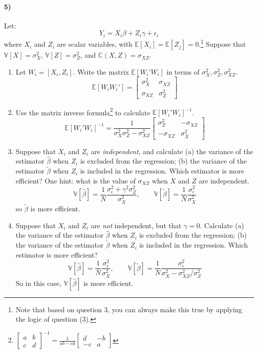 \documentclass[12pt]{article}
\newcommand\BB{\mathbb}
\newcommand\EE{\mathbb{E}}
\newcommand\eps{\epsilon}
\newcommand\barr{\begin{array}}
\newcommand\earr{\end{array}}
\numberwithin{equation}{section}
\numberwithin{figure}{section}
\numberwithin{table}{section}
\begin{document}
\paragraph{5)} Let:
\[Y_i = X_i\beta + Z_i\gamma + \eps_i \]
where $X_i$ and $Z_i$ are scalar variables, with $\EE[X_i]=\EE[Z_j]=0$.\footnote{Note that based on question 3, you can always make this true by applying the logic of question (3).}
Suppose that $\BB{V}[X] = \sigma^2_X$, $\BB{V}[Z]=\sigma^2_Z$, and $\BB{C}(X,Z)=\sigma_{XZ}$.
\begin{enumerate}
\item Let $W_i=[X_i, Z_i]$. Write the matrix $\EE[W_i'W_i]$ in terms of $\sigma^2_X,\sigma^2_Z,\sigma^2_{XZ}$. 
{\color{blue} \[\EE[W_iW_i'] = \left[\barr{cc}\sigma^2_X & \sigma_{XZ} \\ \sigma_{XZ} & \sigma^2_Z \earr\right] \]}

\item Use the matrix inverse formula\footnote{$\left[\begin{array}{cc}a & b \\c & d \end{array}\right]^{-1}=\frac{1}{ab-cd}\left[\begin{array}{cc}d & -b \\-c & a \end{array}\right]$} to calculate $\EE[W_i'W_i]^{-1}$.
{\color{blue}\[ \EE[W_i'W_i]^{-1} = \frac{1}{\sigma^2_{X}\sigma^2_Z - \sigma_{XZ}^2} \left[\barr{cc} \sigma^2_Z & -\sigma_{XZ} \\-\sigma_{XZ} & \sigma^2_X  \earr\right] \]}
\item Suppose that $X_i$ and $Z_i$ are \emph{independent}, and calculate (a) the variance of the estimator $\hat{\beta}$ when $Z_i$ is excluded from the regression; (b) the variance of the estimator $\tilde{\beta}$ when $Z_i$ is included in the regression. Which estimator is more efficient? One hint: what is the value of $\sigma_{XZ}$ when $X$ and $Z$ are independent.
{\color{blue}
\[\BB{V}[\hat{\beta}] = \frac{1}{N}\frac{\sigma^2_\eps + \gamma^2\sigma^2_Z }{\sigma^2_X},\qquad \BB{V}[\tilde{\beta}] = \frac{1}{N}\frac{\sigma^2_\eps}{\sigma^2_X} \]
so $\tilde{\beta}$ is more efficient. }
\item Suppose that $X_i$ and $Z_i$ are \emph{not} independent, but that $\gamma=0$. Calculate (a) the variance of the estimator $\hat{\beta}$ when $Z_i$ is excluded from the regression; (b) the variance of the estimator $\tilde{\beta}$ when $Z_i$ is included in the regression. Which estimator is more efficient?
{\color{blue}
\[ \BB{V}[\hat{\beta}] = \frac{1}{N}\frac{\sigma^2_\eps}{\sigma^2_X},\qquad \BB{V}[\tilde{\beta}] = \frac{1}{N}\frac{\sigma^2_\eps}{\sigma^2_{X}-\sigma^2_{XZ}/\sigma^2_{Z}} \]
So in this case, $\BB{V}[\hat{\beta}]$ is more efficient.}
\end{enumerate}
\end{document}
